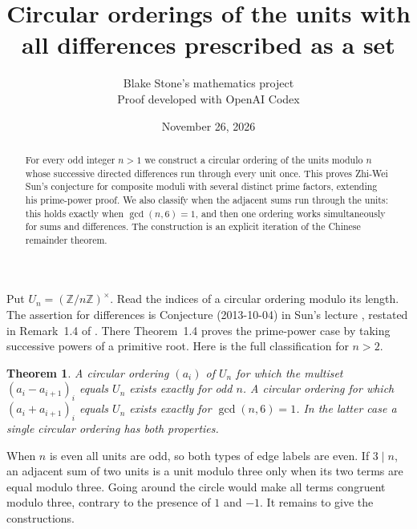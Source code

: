 \documentclass[11pt]{article}
\title{Circular orderings of the units with all differences prescribed as a set}
\author{Blake Stone's mathematics project\\\small Proof developed with OpenAI Codex}
\date{November 26, 2026}
\newtheorem{theorem}{Theorem}
\begin{document}
\maketitle
\begin{abstract}
For every odd integer $n>1$ we construct a circular ordering of the units modulo $n$ whose successive directed differences run through every unit once. This proves Zhi-Wei Sun's conjecture for composite moduli with several distinct prime factors, extending his prime-power proof. We also classify when the adjacent sums run through the units: this holds exactly when $\gcd(n,6)=1$, and then one ordering works simultaneously for sums and differences. The construction is an explicit iteration of the Chinese remainder theorem.
\end{abstract}

Put $U_n=(\mathbb Z/n\mathbb Z)^\times$. Read the indices of a circular ordering modulo its length. The assertion for differences is Conjecture (2013-10-04) in Sun's lecture \cite{lecture}, restated in Remark~1.4 of \cite{sun}. There Theorem~1.4 proves the prime-power case by taking successive powers of a primitive root. Here is the full classification for $n>2$.
\begin{theorem}\label{th:class}
A circular ordering $(a_i)$ of $U_n$ for which the multiset $(a_i-a_{i+1})_i$ equals $U_n$ exists exactly for odd $n$. A circular ordering for which $(a_i+a_{i+1})_i$ equals $U_n$ exists exactly for $\gcd(n,6)=1$. In the latter case a single circular ordering has both properties.
\end{theorem}
When $n$ is even all units are odd, so both types of edge labels are even. If $3\mid n$, an adjacent sum of two units is a unit modulo three only when its two terms are equal modulo three. Going around the circle would make all terms congruent modulo three, contrary to the presence of $1$ and $-1$. It remains to give the constructions.
\end{document}

